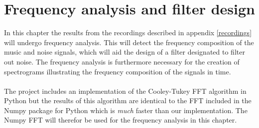 \chapter{Frequency analysis and filter design} \label{ch9}
In this chapter the results from the recordings described in appendix \ref{recordings} will undergo frequency analysis. This will detect the frequency composition of the music and noise signals, which will aid the design of a filter designated to filter out noise. The frequency analysis is furthermore necessary for the creation of spectrograms illustrating the frequency composition of the signals in time. \\ \\
The project includes an implementation of the Cooley-Tukey FFT algorithm in Python but the results of this algorithm are identical to the FFT included in the Numpy package for Python which is \textit{much} faster than our implementation. The Numpy FFT will therefor be used for the frequency analysis in this chapter. 


